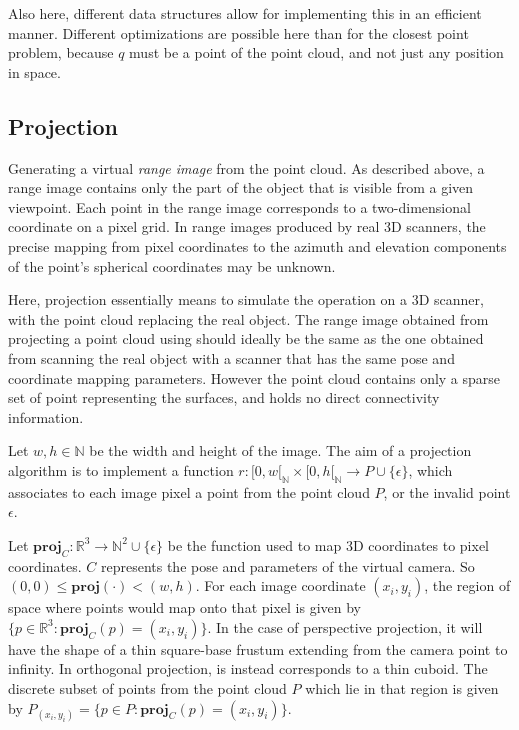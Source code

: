 Also here, different data structures allow for implementing this in an efficient manner. Different optimizations are possible here than for the closest point problem, because $q$ must be a point of the point cloud, and not just any position in space.


\subsection{Projection}
Generating a virtual \emph{range image} from the point cloud. As described above, a range image contains only the part of the object that is visible from a given viewpoint. Each point in the range image corresponds to a two-dimensional coordinate on a pixel grid. In range images produced by real 3D scanners, the precise mapping from pixel coordinates to the azimuth and elevation components of the point's spherical coordinates may be unknown.

Here, projection essentially means to simulate the operation on a 3D scanner, with the point cloud replacing the real object. The range image obtained from projecting a point cloud using should ideally be the same as the one obtained from scanning the real object with a scanner that has the same pose and coordinate mapping parameters. However the point cloud contains only a sparse set of point representing the surfaces, and holds no direct connectivity information.

Let $w, h \in \mathbb{N}$ be the width and height of the image. The aim of a projection algorithm is to implement a function $r : [0, w[_{\mathbb{N}} \times [0, h[_{\mathbb{N}} \rightarrow P \cup \{ \epsilon \}$, which associates to each image pixel a point from the point cloud $P$, or the invalid point $\epsilon$. 

Let $\mathbf{proj}_{C} : \mathbb{R}^3 \rightarrow \mathbb{N}^2 \cup \{ \epsilon \}$ be the function used to map 3D coordinates to pixel coordinates. $C$ represents the pose and parameters of the virtual camera. So $(0, 0) \leq \mathbf{proj}(\cdot) < (w, h)$. For each image coordinate $(x_i, y_i)$, the region of space where points would map onto that pixel is given by $\{ p \in \mathbb{R}^3 : \mathbf{proj}_{C}(p) = (x_i, y_i) \}$. In the case of perspective projection, it will have the shape of a thin square-base frustum extending from the camera point to infinity. In orthogonal projection, is instead corresponds to a thin cuboid. The discrete subset of points from the point cloud $P$ which lie in that region is given by $P_{(x_i,y_i)} = \{ p \in P : \mathbf{proj}_{C}(p) = (x_i, y_i) \}$.

